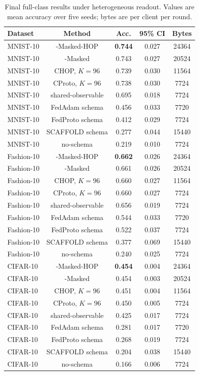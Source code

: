 \begin{table}[t]
\centering
\caption{Final full-class results under heterogeneous readout. Values are mean accuracy over five seeds; bytes are per client per round.}
\label{tab:masked-fullclass}
\begin{tabular}{lcccc}
\toprule
Dataset & Method & Acc. & 95\% CI & Bytes \\
\midrule
MNIST-10 & \method{}-Masked-HOP & \textbf{0.744} & 0.027 & 24364 \\
MNIST-10 & \method{}-Masked & 0.743 & 0.027 & 20524 \\
MNIST-10 & CHOP, \(K=96\) & 0.739 & 0.030 & 11564 \\
MNIST-10 & CProto, \(K=96\) & 0.738 & 0.030 & 7724 \\
MNIST-10 & shared-observable & 0.695 & 0.018 & 7724 \\
MNIST-10 & FedAdam schema & 0.456 & 0.033 & 7720 \\
MNIST-10 & FedProto schema & 0.412 & 0.029 & 7724 \\
MNIST-10 & SCAFFOLD schema & 0.277 & 0.044 & 15440 \\
MNIST-10 & no-schema & 0.219 & 0.010 & 7724 \\
\midrule
Fashion-10 & \method{}-Masked-HOP & \textbf{0.662} & 0.026 & 24364 \\
Fashion-10 & \method{}-Masked & 0.661 & 0.026 & 20524 \\
Fashion-10 & CHOP, \(K=96\) & 0.660 & 0.027 & 11564 \\
Fashion-10 & CProto, \(K=96\) & 0.660 & 0.027 & 7724 \\
Fashion-10 & shared-observable & 0.656 & 0.019 & 7724 \\
Fashion-10 & FedAdam schema & 0.544 & 0.033 & 7720 \\
Fashion-10 & FedProto schema & 0.522 & 0.037 & 7724 \\
Fashion-10 & SCAFFOLD schema & 0.377 & 0.069 & 15440 \\
Fashion-10 & no-schema & 0.240 & 0.025 & 7724 \\
\midrule
CIFAR-10 & \method{}-Masked-HOP & \textbf{0.454} & 0.004 & 24364 \\
CIFAR-10 & \method{}-Masked & 0.454 & 0.003 & 20524 \\
CIFAR-10 & CHOP, \(K=96\) & 0.451 & 0.004 & 11564 \\
CIFAR-10 & CProto, \(K=96\) & 0.450 & 0.005 & 7724 \\
CIFAR-10 & shared-observable & 0.425 & 0.017 & 7724 \\
CIFAR-10 & FedAdam schema & 0.281 & 0.017 & 7720 \\
CIFAR-10 & FedProto schema & 0.268 & 0.019 & 7724 \\
CIFAR-10 & SCAFFOLD schema & 0.204 & 0.038 & 15440 \\
CIFAR-10 & no-schema & 0.166 & 0.006 & 7724 \\
\bottomrule
\end{tabular}
\end{table}
